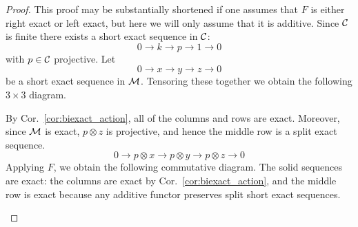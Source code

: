 \documentclass{amsart}
\begin{document}
\begin{proof}
	This proof may be substantially shortened if one assumes that $F$ is either right exact or left exact, but here we will only assume that it is additive. 
	Since $\mathcal C$ is finite there exists a short exact sequence in $\mathcal C$:
	\begin{equation*}
		0 \to k \to p \to 1 \to 0
	\end{equation*}
	with $p \in \mathcal C$ projective. Let
	\begin{equation*}
		0 \to x \to y \to z \to 0
	\end{equation*}
	be a short exact sequence in $\mathcal M$. Tensoring these together we obtain the following $3 \times 3$ diagram. 
	\begin{center}
	\end{center}
	By Cor.~\ref{cor:biexact_action}, all of the columns and rows are exact. Moreover, since $\mathcal M$ is exact, $p \otimes z$ is projective, and hence the middle row is a split exact sequence. 
		\begin{equation*}
		0 \to p \otimes x \to p \otimes y \to p \otimes z \to 0 
	\end{equation*}
	Applying $F$, we obtain the following commutative diagram. The solid sequences are exact: the columns are exact by Cor.~\ref{cor:biexact_action}, and the middle row is exact because any additive functor preserves split short exact sequences. 
	\begin{center}
\end{center}
\end{proof}
\end{document}

